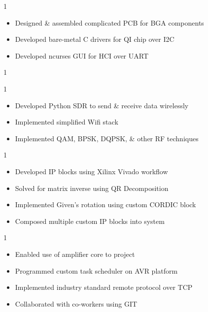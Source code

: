 \documentclass[10pt, letterpaper, ragged2e, withhyper]{AltaCV/altacv}
\def\RUWPTRX{0}		%
\def\RUSDR{0}		%
\def\RUXILINX{1}	%
\def\RSEAMP{1}		%
\begin{document}
\begin{paracol}{2}
\if\RUWPTRX1
\begin{itemize}
\item Designed \& assembled complicated PCB for BGA components
\item Developed bare-metal C drivers for QI chip over I2C
\item Developed ncurses GUI for HCI over UART
\end{itemize}
\fi

\if\RUSDR1

\if\RUWPTRX1
\divider
\fi

\begin{itemize}
\item Developed Python SDR to send \& receive data wirelessly
\item Implemented simplified Wifi stack
\item Implemented QAM, BPSK, DQPSK, \& other RF techniques
\end{itemize}
\fi

\if\RUXILINX1


\begin{itemize}
\item Developed IP blocks using Xilinx Vivado workflow
\item Solved for matrix inverse using QR Decomposition
\item Implemented Given's rotation using custom CORDIC block
\item Composed multiple custom IP blocks into system
\end{itemize}
\fi

\if\RSEAMP1
\divider
{}
\begin{itemize}
\item Enabled use of amplifier core to project
\item Programmed custom task scheduler on AVR platform
\item Implemented industry standard remote protocol over TCP
\item Collaborated with co-workers using GIT
\end{itemize}
\fi


\end{paracol}
\end{document}
